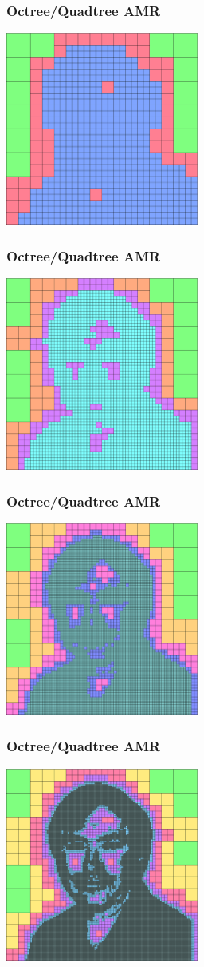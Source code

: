 \documentclass{beamer}
\begin{document}
\begin{frame}
\frametitle{Octree/Quadtree AMR}
\centerline{\includegraphics[width=2.5in]{norman-5.eps}}
\end{frame}
\begin{frame}
\frametitle{Octree/Quadtree AMR}
\centerline{\includegraphics[width=2.5in]{norman-6.eps}}
\end{frame}
\begin{frame}
\frametitle{Octree/Quadtree AMR}
\centerline{\includegraphics[width=2.5in]{norman-7.eps}}
\end{frame}
\begin{frame}
\frametitle{Octree/Quadtree AMR}
\centerline{\includegraphics[width=2.5in]{norman-8.eps}}
\end{frame}
\end{document}
